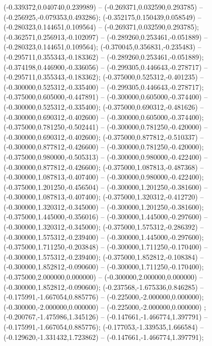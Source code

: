  (-0.339372,0.040740,0.239989) -- (-0.269371,0.032590,0.293785) -- (-0.256925,-0.079353,0.493286);
 (-0.352175,0.150439,0.058549) -- (-0.280323,0.144651,0.109564) -- (-0.269371,0.032590,0.293785);
 (-0.362571,0.256913,-0.102097) -- (-0.289260,0.253461,-0.051889) -- (-0.280323,0.144651,0.109564);
 (-0.370045,0.356831,-0.235483) -- (-0.295711,0.355343,-0.183362) -- (-0.289260,0.253461,-0.051889);
 (-0.374198,0.446900,-0.336056) -- (-0.299305,0.446643,-0.278717) -- (-0.295711,0.355343,-0.183362);
 (-0.375000,0.525312,-0.401235) -- (-0.300000,0.525312,-0.335400) -- (-0.299305,0.446643,-0.278717);
 (-0.375000,0.605000,-0.447891) -- (-0.300000,0.605000,-0.374400) -- (-0.300000,0.525312,-0.335400);
 (-0.375000,0.690312,-0.481626) -- (-0.300000,0.690312,-0.402600) -- (-0.300000,0.605000,-0.374400);
 (-0.375000,0.781250,-0.502441) -- (-0.300000,0.781250,-0.420000) -- (-0.300000,0.690312,-0.402600);
 (-0.375000,0.877812,-0.510337) -- (-0.300000,0.877812,-0.426600) -- (-0.300000,0.781250,-0.420000);
 (-0.375000,0.980000,-0.505313) -- (-0.300000,0.980000,-0.422400) -- (-0.300000,0.877812,-0.426600);
 (-0.375000,1.087813,-0.487368) -- (-0.300000,1.087813,-0.407400) -- (-0.300000,0.980000,-0.422400);
 (-0.375000,1.201250,-0.456504) -- (-0.300000,1.201250,-0.381600) -- (-0.300000,1.087813,-0.407400);
 (-0.375000,1.320312,-0.412720) -- (-0.300000,1.320312,-0.345000) -- (-0.300000,1.201250,-0.381600);
 (-0.375000,1.445000,-0.356016) -- (-0.300000,1.445000,-0.297600) -- (-0.300000,1.320312,-0.345000);
 (-0.375000,1.575312,-0.286392) -- (-0.300000,1.575312,-0.239400) -- (-0.300000,1.445000,-0.297600);
 (-0.375000,1.711250,-0.203848) -- (-0.300000,1.711250,-0.170400) -- (-0.300000,1.575312,-0.239400);
 (-0.375000,1.852812,-0.108384) -- (-0.300000,1.852812,-0.090600) -- (-0.300000,1.711250,-0.170400);
 (-0.375000,2.000000,0.000000) -- (-0.300000,2.000000,0.000000) -- (-0.300000,1.852812,-0.090600);
 (-0.237568,-1.675336,0.846285) -- (-0.175991,-1.667054,0.885776) -- (-0.225000,-2.000000,0.000000);
 (-0.300000,-2.000000,0.000000) -- (-0.225000,-2.000000,0.000000) ;
 (-0.200767,-1.475986,1.345126) -- (-0.147661,-1.466774,1.397791) -- (-0.175991,-1.667054,0.885776);
 (-0.177053,-1.339535,1.666584) -- (-0.129620,-1.331432,1.723862) -- (-0.147661,-1.466774,1.397791);
